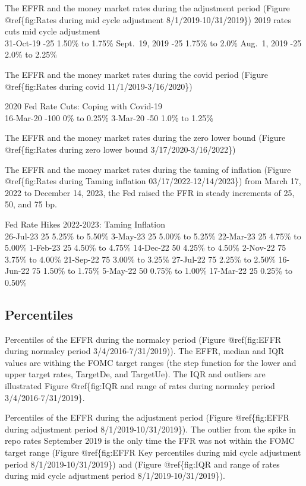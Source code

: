 \documentclass[
]{article}
\begin{document}
The EFFR and the money market rates during the adjustment period (Figure @ref\{fig:Rates during mid cycle adjustment 8/1/2019-10/31/2019\})
2019 rates cuts mid cycle adjustment\\
31-Oct-19 -25 1.50\% to 1.75\%
Sept.~19, 2019 -25 1.75\% to 2.0\%
Aug.~1, 2019 -25 2.0\% to 2.25\%

The EFFR and the money market rates during the covid period (Figure @ref\{fig:Rates during covid 11/1/2019-3/16/2020\})

2020 Fed Rate Cuts: Coping with Covid-19\\
16-Mar-20 -100 0\% to 0.25\%
3-Mar-20 -50 1.0\% to 1.25\%

The EFFR and the money market rates during the zero lower bound (Figure @ref\{fig:Rates during zero lower bound 3/17/2020-3/16/2022\})

The EFFR and the money market rates during the taming of inflation (Figure @ref\{fig:Rates during
Taming inflation 03/17/2022-12/14/2023\}) from March 17, 2022 to December 14, 2023, the Fed raised the FFR in steady increments of 25, 50, and 75 bp.

Fed Rate Hikes 2022-2023: Taming Inflation\\
26-Jul-23 25 5.25\% to 5.50\%
3-May-23 25 5.00\% to 5.25\%
22-Mar-23 25 4.75\% to 5.00\%
1-Feb-23 25 4.50\% to 4.75\%
14-Dec-22 50 4.25\% to 4.50\%
2-Nov-22 75 3.75\% to 4.00\%
21-Sep-22 75 3.00\% to 3.25\%
27-Jul-22 75 2.25\% to 2.50\%
16-Jun-22 75 1.50\% to 1.75\%
5-May-22 50 0.75\% to 1.00\%
17-Mar-22 25 0.25\% to 0.50\%

\hypertarget{percentiles}{%
\subsection{Percentiles}\label{percentiles}}

Percentiles of the EFFR during the normalcy period (Figure @ref(fig:EFFR during normalcy period 3/4/2016-7/31/2019)). The EFFR, median and IQR values are withing the FOMC target ranges (the step function for the lower and upper target rates, TargetDe, and TargetUe). The IQR and outliers are illustrated Figure @ref\{fig:IQR and range of rates during normalcy period 3/4/2016-7/31/2019\}.

Percentiles of the EFFR during the adjustment period (Figure @ref\{fig:EFFR during adjustment period 8/1/2019-10/31/2019\}). The outlier from the spike in repo rates September 2019 is the only time the FFR was not within the FOMC target range (Figure @ref\{fig:EFFR Key percentiles during mid cycle adjustment period 8/1/2019-10/31/2019\}) and (Figure @ref\{fig:IQR and range of rates during mid cycle adjustment period 8/1/2019-10/31/2019\}).
\end{document}

